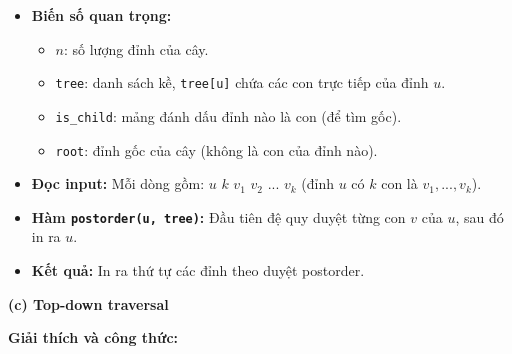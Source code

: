 \documentclass{article}
\begin{document}
\begin{itemize}
    \item \textbf{Biến số quan trọng:}
    \begin{itemize}
        \item $n$: số lượng đỉnh của cây.
        \item \texttt{tree}: danh sách kề, \texttt{tree[u]} chứa các con trực tiếp của đỉnh $u$.
        \item \texttt{is\_child}: mảng đánh dấu đỉnh nào là con (để tìm gốc).
        \item \texttt{root}: đỉnh gốc của cây (không là con của đỉnh nào).
    \end{itemize}
    \item \textbf{Đọc input:} Mỗi dòng gồm: $u$ $k$ $v_1$ $v_2$ ... $v_k$ (đỉnh $u$ có $k$ con là $v_1, ..., v_k$).
    \item \textbf{Hàm \texttt{postorder(u, tree)}:} Đầu tiên đệ quy duyệt từng con $v$ của $u$, sau đó in ra $u$.
    \item \textbf{Kết quả:} In ra thứ tự các đỉnh theo duyệt postorder.
\end{itemize}



\textbf{(c) Top-down traversal}

\textbf{Giải thích và công thức:}
\end{document}
